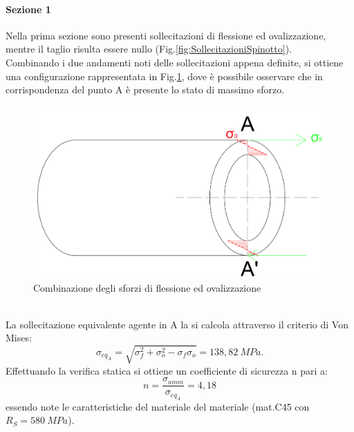 \paragraph{Sezione 1} Nella prima sezione sono presenti sollecitazioni di flessione ed ovalizzazione, mentre il taglio risulta essere nullo (Fig.\ref{fig:SollecitazioniSpinotto}).\\
Combinando i due andamenti noti delle sollecitazioni appena definite, si ottiene una configurazione rappresentata in Fig.\ref{fig:Sezione1Spinotto}, dove è possibile osservare che in corrispondenza del punto A è presente lo stato di massimo sforzo.\\
\begin{figure}[h]
    \centering
    \includegraphics[scale=0.3]{Immagini/Sezione1Spinotto.png}
    \caption{Combinazione degli sforzi di flessione ed ovalizzazione}
    \label{fig:Sezione1Spinotto}
\end{figure}
\\
La sollecitazione equivalente agente in A la si calcola attraverso il criterio di Von Mises:
\begin{equation}
    \sigma_{eq_{A}}=\sqrt{\sigma_f^2+\sigma_o^2-\sigma_f\sigma_o}=138,82\ MPa.
\end{equation}
Effettuando la verifica statica si ottiene un coefficiente di sicurezza n pari a:
\begin{equation}
    n=\frac{\sigma_{amm}}{\sigma_{eq_{A}}}=4,18
\end{equation}
essendo note le caratteristiche del materiale del materiale (mat.C45 con $R_S=580\ MPa$).
